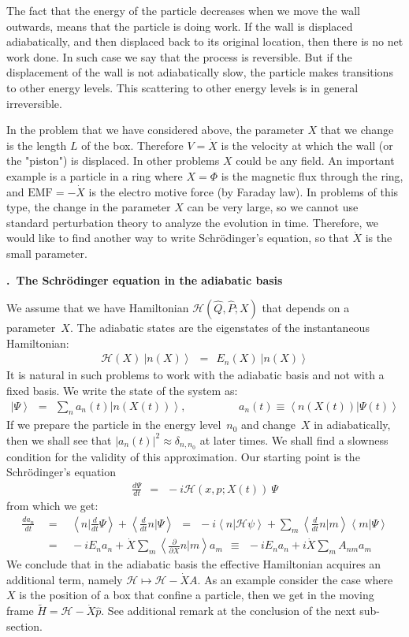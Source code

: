 \documentclass[onecolumn,fleqn, 11pt]{revtex4}
\newcommand{\beq}{\begin{eqnarray}}
\newcommand{\eeq}{\end{eqnarray}}
\renewcommand{\thesubsection}{\arabic{subsection}}
\renewcommand{\thesubsubsection}{\arabic{subsubsection}}
\newcommand{\sheadC}[1]
{
\addtocounter{subsubsection}{1}
\vspace{5mm}
{\bf \thesubsection.\thesubsubsection \ #1}  
\nopagebreak
\phantomsection
}
\begin{document}
The fact that the energy of the particle decreases 
when we move the wall outwards, means that the particle 
is doing work. If the wall is displaced adiabatically, 
and then displaced back to its original location, 
then there is no net work done. In such case 
we say that the process is reversible. 
But if the displacement of the wall is not adiabatically slow, 
the particle makes transitions to other energy levels. 
This scattering to other energy levels is in general irreversible. 

In the problem that we have considered above, 
the parameter $X$ that we change is the length $L$ 
of the box. Therefore ${V=\dot{X}}$ 
is the velocity at which the wall (or the "piston") 
is displaced. In other problems ${X}$ could 
be any field. An important example is 
a particle in a ring where ${X=\Phi}$ is the 
magnetic flux through the ring, 
and ${\mbox{EMF}=-\dot{X}}$ is the electro motive force 
(by Faraday law). In problems of this type, the 
change in the parameter ${X}$ can be very large, 
so we cannot use standard perturbation theory to analyze 
the evolution in time. Therefore, we would like to 
find another way to write Schr\"{o}dinger's equation, 
so that ${\dot{X}}$ is the small parameter.



 
\sheadC{The Schr\"{o}dinger equation in the adiabatic basis} 

We assume that we have Hamiltonian $\mathcal{H}(\hat{Q},\hat{P};X)$ 
that depends on a parameter~$X$. The adiabatic states 
are the eigenstates of the instantaneous Hamiltonian:
\beq
\mathcal{H}(X) \ \left|n(X) \right\rangle \ \ = \ \ E_n(X) \ \left|n(X) \right\rangle 
\eeq
It is natural in such problems to work with the adiabatic 
basis and not with a fixed basis. 
We write the state of the system as:
\beq
\left|\Psi \right\rangle \ \ = \ \ \sum_n a_n(t) \left|n(X(t))\right\rangle, 
\hspace{2cm} a_n(t) \equiv \left\langle n(X(t))|\Psi(t)\right\rangle
\eeq
If we prepare the particle in the energy level~$n_0$ 
and change~$X$ in adiabatically, 
then we shall see that ${|a_n(t)|^2 \approx \delta_{n,n_0}}$ at later times. 
We shall find a slowness condition for the validity of this approximation. 
Our starting point is the Schr\"{o}dinger's equation  
\beq
\frac{d\Psi}{dt} \ \ = \ \ -i\mathcal{H}(x,p;X(t)) \ \Psi
\eeq
from which we get:
\beq
\frac{d a_n}{dt} 
\ \ &=& \ \ 
\left\langle n \Big| \frac{d}{dt} \Psi\right\rangle 
+ \left\langle\frac{d}{dt}n \Big| \Psi\right\rangle 
\ \ = \ \ 
-i\left\langle n\Big|\mathcal{H} \psi \right\rangle 
+ \sum_m\left\langle\frac{d}{dt}n\Big|m\right\rangle \left\langle m \Big| \Psi \right\rangle 
\\
\ \ &=& \ \ 
-i E_n a_n + \dot{X}\sum_m\left\langle \frac{\partial}{\partial X}n\Big|m\right\rangle a_m 
\ \ \equiv \ \ 
-i E_n a_n + i \dot{X}\sum_m A_{nm} a_m  
\eeq
We conclude that in the adiabatic basis the effective Hamiltonian 
acquires an additional term, 
namely ${\mathcal{H} \mapsto \mathcal{H} - \dot{X} A}$. 
As an example consider the case where $X$ is the position 
of a box that confine a particle, 
then we get in the moving frame ${\tilde{H} = \mathcal{H} - \dot{X} \hat{p}}$.  
See additional remark at the conclusion of the next sub-section.
\end{document}
